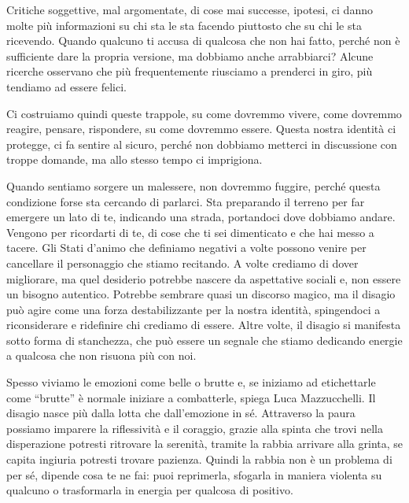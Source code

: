 \documentclass[12pt]{book} %
\begin{document}
Critiche soggettive, mal argomentate, di cose mai successe, ipotesi, ci danno molte più
informazioni su chi sta le sta facendo piuttosto che su chi le sta ricevendo. Quando qualcuno ti accusa di
qualcosa che non hai fatto, perché non è sufficiente dare la propria versione, ma dobbiamo anche arrabbiarci? 
Alcune ricerche osservano che più frequentemente riusciamo a prenderci in giro, più tendiamo ad essere felici.

Ci costruiamo quindi queste trappole, su come dovremmo vivere, come dovremmo reagire, pensare, rispondere, su come dovremmo
essere. Questa nostra identità ci protegge, ci fa sentire al sicuro, perché non dobbiamo metterci in discussione con
troppe domande, ma allo stesso tempo ci imprigiona.

Quando sentiamo sorgere un malessere, non dovremmo fuggire, perché questa condizione forse sta cercando di parlarci. Sta preparando il terreno per far emergere un lato di te, indicando una strada, portandoci dove dobbiamo andare. Vengono per ricordarti di te, di cose che ti sei dimenticato e che hai messo a tacere. Gli Stati d'animo che definiamo negativi a volte possono venire per cancellare il personaggio che stiamo recitando. A volte crediamo di dover migliorare, ma quel desiderio potrebbe nascere da aspettative sociali e, non essere un bisogno autentico. Potrebbe sembrare quasi un discorso magico, ma il disagio può agire come una forza destabilizzante per la nostra identità, spingendoci a riconsiderare e ridefinire chi crediamo di essere. Altre volte, il disagio si manifesta sotto forma di stanchezza, che può essere un segnale che stiamo dedicando energie a qualcosa che non risuona più con noi.

Spesso viviamo le emozioni come belle o brutte e, se iniziamo ad etichettarle come “brutte” è normale iniziare a combatterle, spiega Luca Mazzucchelli. Il disagio nasce più dalla lotta che dall'emozione in sé. Attraverso la paura possiamo imparere la riflessività e il coraggio, grazie alla spinta che trovi nella disperazione potresti ritrovare la serenità, tramite la rabbia arrivare alla grinta, se capita ingiuria potresti trovare pazienza. Quindi la rabbia non è un problema di per sé, dipende cosa te ne fai: puoi reprimerla, sfogarla in maniera violenta su qualcuno o trasformarla in energia per qualcosa di positivo.
\end{document}

